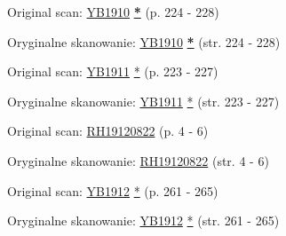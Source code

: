

Original scan: \href{https://documents.adventistarchives.org/Yearbooks/YB1910.pdf#search=Yearbook%201910}{YB1910} \textbf{\href{https://forgotten-pillar.s3.us-east-2.amazonaws.com/YB1910.pdf}{*}} (p. 224 - 228)


Oryginalne skanowanie: \href{https://documents.adventistarchives.org/Yearbooks/YB1910.pdf#search=Yearbook%201910}{YB1910} \textbf{\href{https://forgotten-pillar.s3.us-east-2.amazonaws.com/YB1910.pdf}{*}} (str. 224 - 228)






Original scan: \href{https://documents.adventistarchives.org/Yearbooks/YB1911.pdf#search=Yearbook%201910}{YB1911} \href{https://forgotten-pillar.s3.us-east-2.amazonaws.com/YB1911.pdf}{*} (p. 223 - 227)


Oryginalne skanowanie: \href{https://documents.adventistarchives.org/Yearbooks/YB1911.pdf#search=Yearbook%201910}{YB1911} \href{https://forgotten-pillar.s3.us-east-2.amazonaws.com/YB1911.pdf}{*} (str. 223 - 227)






Original scan: \href{https://adventistdigitallibrary.org/adl-351682/advent-review-and-sabbath-herald-august-22-1912?view_only=true&solr_nav%5Bid%5D=ff4d7f3f77b9bdf9e9ac&solr_nav%5Bpage%5D=0&solr_nav%5Boffset%5D=15}{RH19120822} (p. 4 - 6)


Oryginalne skanowanie: \href{https://adventistdigitallibrary.org/adl-351682/advent-review-and-sabbath-herald-august-22-1912?view_only=true&solr_nav%5Bid%5D=ff4d7f3f77b9bdf9e9ac&solr_nav%5Bpage%5D=0&solr_nav%5Boffset%5D=15}{RH19120822} (str. 4 - 6)






Original scan: \href{https://documents.adventistarchives.org/Yearbooks/YB1912.pdf#search=Yearbook%201910}{YB1912} \href{https://forgotten-pillar.s3.us-east-2.amazonaws.com/YB1912.pdf}{*} (p. 261 - 265)


Oryginalne skanowanie: \href{https://documents.adventistarchives.org/Yearbooks/YB1912.pdf#search=Yearbook%201910}{YB1912} \href{https://forgotten-pillar.s3.us-east-2.amazonaws.com/YB1912.pdf}{*} (str. 261 - 265)


